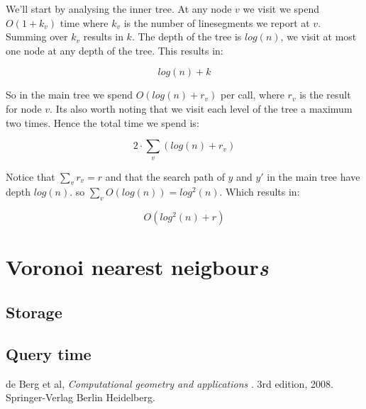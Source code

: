 \documentclass{article}
\begin{document}
We'll start by analysing the inner tree.
At any node $v$ we visit we spend $O(1+k_v)$ time where
$k_v$ is the number of linesegments we report at $v$. Summing
over $k_v$ results in $k$. The depth of the tree is $log(n)$,
we visit at most one node at any depth of the tree. This results in:

\[ log(n)+k\]

So in the main tree we spend $O(log(n)+r_v)$ per call, where $r_v$ is
the result for node $v$. Its also worth noting that we visit each level
of the tree a maximum two times. Hence the total time we spend is:

\[ 2\cdot \sum_v(log(n)+r_v)\]

Notice that $\sum_v r_v = r$ and that the search path of $y$ and $y'$
in the main tree have depth $log(n)$. so $\sum_v O(log(n))=log^2(n)$.
Which results in:

\[ O(log^2(n)+r) \]

\section{Voronoi nearest neigbour\emph{s}}
\subsection{Storage}
\subsection{Query time}

\begin{thebibliography}{9}
de Berg et al,
\textit{Computational geometry and applications }.
3rd edition, 2008. Springer-Verlag Berlin Heidelberg.
\end{thebibliography}
\end{document}
